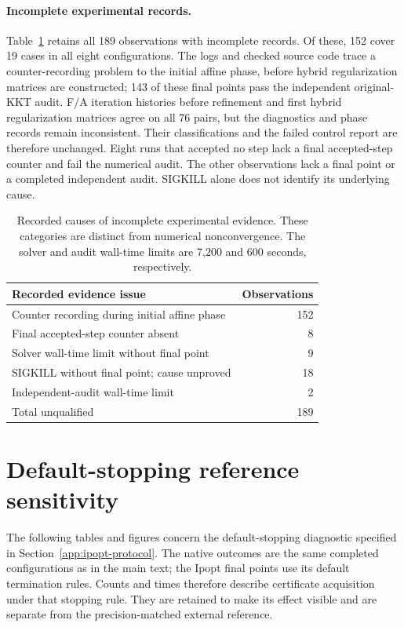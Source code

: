 \documentclass[pdflatex,sn-mathphys-num]{sn-jnl}
\theoremstyle{thmstyleone}
\theoremstyle{thmstylethree}
\begin{document}
\paragraph{Incomplete experimental records.}
Table~\ref{tab:controlled-refinement-evidence} retains all 189 observations
with incomplete records. Of these, 152 cover 19 cases in all eight
configurations. The logs and checked source code trace a counter-recording problem to
the initial affine phase, before hybrid regularization matrices are
constructed; 143 of these final points pass the independent
original-KKT audit. F/A iteration histories before refinement and first
hybrid regularization matrices agree on all 76 pairs, but the diagnostics
and phase records remain inconsistent. Their classifications and the
failed control report are therefore unchanged. Eight runs that accepted
no step lack a final accepted-step counter and fail the numerical audit.
The other observations lack a final point or a completed independent audit.
SIGKILL alone does not identify its underlying cause.

\begin{table}[!htbp]
\centering\small
\caption{Recorded causes of incomplete experimental evidence. These
categories are distinct from numerical nonconvergence. The solver and
audit wall-time limits are 7,200 and 600 seconds, respectively.}
\label{tab:controlled-refinement-evidence}
\begin{tabular}{@{}lr@{}}
\toprule
Recorded evidence issue & Observations\\
\midrule
Counter recording during initial affine phase & 152\\
Final accepted-step counter absent & 8\\
Solver wall-time limit without final point & 9\\
SIGKILL without final point; cause unproved & 18\\
Independent-audit wall-time limit & 2\\
\midrule
Total unqualified & 189\\
\bottomrule
\end{tabular}

\end{table}
\FloatBarrier

\section{Default-stopping reference sensitivity}\label{app:default-reference-sensitivity}
The following tables and figures concern the default-stopping diagnostic
specified in Section~\ref{app:ipopt-protocol}. The native outcomes are the
same completed configurations as in the main text; the Ipopt final points
use its default termination rules. Counts and times therefore describe
certificate acquisition under that stopping rule. They are retained to
make its effect visible and are separate from the precision-matched
external reference.
\end{document}
